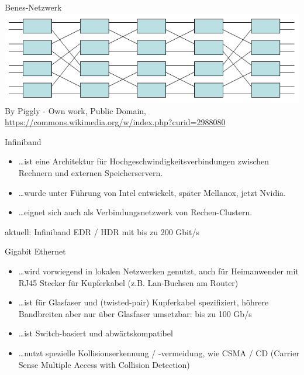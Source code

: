 \begin{defi}{Benes-Netzwerk}
    \includegraphics[width=\textwidth]{includes/graphics/Benesnetwork.png}
    By Piggly - Own work, Public Domain, \url{https://commons.wikimedia.org/w/index.php?curid=2988080}
\end{defi}

\begin{defi}{Infiniband}
    \begin{itemize}
        \item \ldots ist eine Architektur für Hochgeschwindigkeitsverbindungen zwischen Rechnern und externen Speicherservern.
        \item \ldots wurde unter Führung von Intel entwickelt, später Mellanox, jetzt Nvidia.
        \item \ldots eignet sich auch als Verbindungsnetzwerk von Rechen-Clustern.
    \end{itemize}
    aktuell: Infiniband EDR / HDR mit bis zu 200 Gbit/s
\end{defi}

\begin{defi}{Gigabit Ethernet}
    \begin{itemize}
        \item \ldots wird vorwiegend in lokalen Netzwerken genutzt,
              auch für Heimanwender mit RJ45 Stecker für Kupferkabel (z.B. Lan-Buchsen am Router)
        \item \ldots ist für Glasfaser und (twisted-pair) Kupferkabel spezifiziert,
              höhrere Bandbreiten aber nur über Glasfaser umsetzbar: bis zu 100 Gb/s
        \item \ldots ist Switch-basiert und abwärtskompatibel
        \item \ldots nutzt spezielle Kollisionserkennung / -vermeidung,
              wie CSMA / CD (Carrier Sense Multiple Access with Collision Detection)
    \end{itemize}
\end{defi}

